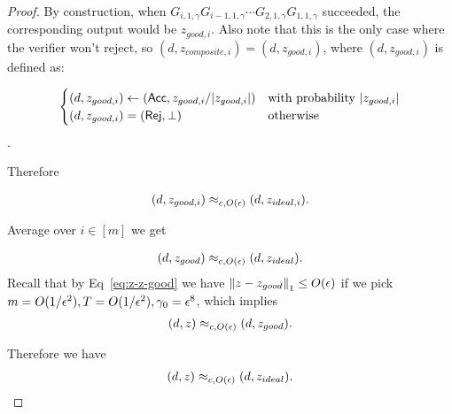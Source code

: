 \begin{proof}
By construction, when $G_{i,1,\gamma}G_{i-1,1,\gamma} \cdots G_{2,1,\gamma}G_{1,1,\gamma}$ succeeded, the corresponding output would be $z_{good,i}$. Also note that this is the only case where the verifier won't reject, so $(d,z_{composite,i})=(d,z_{good,i})$, where $(d,z_{good,i})$ is defined as:

$$\begin{cases}
	(d,z_{good,i}) \leftarrow (\mathsf{Acc}, z_{good,i}/|z_{good,i}|) & \text{with probability } |z_{good,i}|\\
					(d,z_{good,i}) = (\mathsf{Rej},\bot)  & \text{otherwise }
\end{cases}$$.




Therefore

\begin{align}
	(d,z_{good,i})\approx_{c, O(\epsilon)}(d,z_{ideal,i}).
\end{align}

Average over $i\in[m]$ we get

\begin{align}
	(d,z_{good})\approx_{c, O(\epsilon)}(d,z_{ideal}).
\end{align}
Recall that by Eq~\ref{eq:z-z-good} we have $\left\lVert z-z_{good}\right\rVert_1 \leq O(\epsilon)$ if we pick $m=O(1/\epsilon^2), T=O(1/\epsilon^2),\gamma_0=\epsilon^8$, which implies
\begin{align}
	(d,z)\approx_{c, O(\epsilon)}(d,z_{good}).
\end{align}

Therefore  we have  
\begin{align}
	(d,z)\approx_{c, O(\epsilon)}(d,z_{ideal}).
\end{align}


\end{proof}
